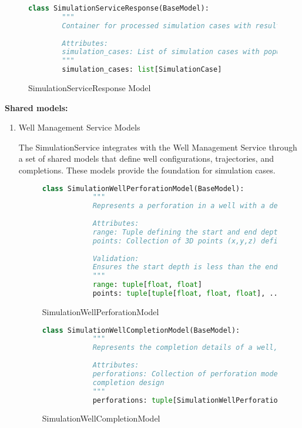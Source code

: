 \begin{figure}[h]
	\begin{lstlisting}[language=Python]
		class SimulationServiceResponse(BaseModel):
		"""
		Container for processed simulation cases with results.
		
		Attributes:
		simulation_cases: List of simulation cases with populated results
		"""
		simulation_cases: list[SimulationCase]
	\end{lstlisting}
	\caption{SimulationServiceResponse Model}
	\label{fig:SimulationService SimulationServiceResponse Model}
\end{figure}

\textbf{Shared models:}
\begin{enumerate}
	\item Well Management Service Models
	
	The SimulationService integrates with the Well Management Service through a set of shared models that define well configurations, trajectories, and completions. These models provide the foundation for simulation cases.
	
	\begin{figure}[H]
		\begin{lstlisting}[language=Python]
			class SimulationWellPerforationModel(BaseModel):
			"""
			Represents a perforation in a well with a depth range and 3D coordinate points.
			
			Attributes:
			range: Tuple defining the start and end depths of the perforation
			points: Collection of 3D points (x,y,z) defining the perforation geometry
			
			Validation:
			Ensures the start depth is less than the end depth
			"""
			range: tuple[float, float]
			points: tuple[tuple[float, float, float], ...]
		\end{lstlisting}
		\caption{SimulationWellPerforationModel}
	\end{figure}
	
	\begin{figure}[H]
		\begin{lstlisting}[language=Python]
			class SimulationWellCompletionModel(BaseModel):
			"""
			Represents the completion details of a well, containing perforations.
			
			Attributes:
			perforations: Collection of perforation models defining the well's
			completion design
			"""
			perforations: tuple[SimulationWellPerforationModel, ...]
		\end{lstlisting}
		\caption{SimulationWellCompletionModel}
	\end{figure}
	

\end{enumerate}
